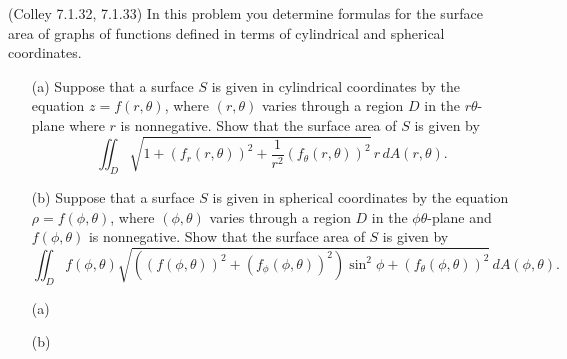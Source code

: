 \documentclass[11pt,letterpaper,cm]{nupset}
\begin{document}
\begin{problem}[Exercise 3] (Colley 7.1.32, 7.1.33) In this problem you determine formulas for the surface area of graphs of functions defined in terms of cylindrical and spherical coordinates.
	\begin{itemize}
		\item[(a)] Suppose that a surface $S$ is given in cylindrical coordinates by the equation $z=f(r,\theta)$, where $(r,\theta)$ varies through a region $D$ in the $r\theta$-plane where $r$ is nonnegative. Show that the surface area of $S$ is given by
		$$\iint_D \sqrt{1+\left(f_r(r,\theta)\right)^2+\frac1{r^2}\left(f_\theta(r,\theta)\right)^2}\,r\,dA(r,\theta).$$
		\item[(b)] Suppose that a surface $S$ is given in spherical coordinates by the equation $\rho=f(\phi,\theta)$, where $(\phi,\theta)$ varies through a region $D$ in the $\phi\theta$-plane and $f(\phi,\theta)$ is nonnegative. Show that the surface area of $S$ is given by
		$$\iint_D f(\phi,\theta)\sqrt{((f(\phi,\theta))^2+(f_\phi(\phi,\theta))^2)\sin^2\phi+(f_\theta(\phi,\theta))^2}\,dA(\phi,\theta).$$
	\end{itemize}
\end{problem}
\begin{solution}
	\begin{itemize}
		\item[(a)]
		\item[(b)]
	\end{itemize}
\end{solution}
\newpage
\end{document}
